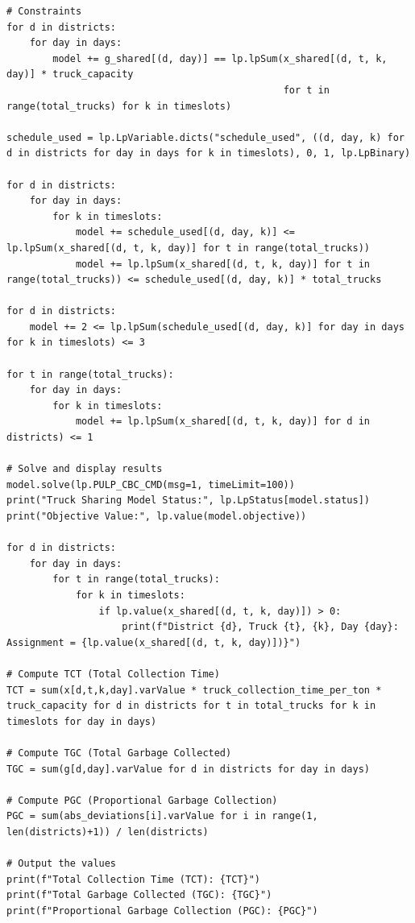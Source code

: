 \documentclass{article}
\begin{document}
\begin{verbatim}
# Constraints
for d in districts:
    for day in days:
        model += g_shared[(d, day)] == lp.lpSum(x_shared[(d, t, k, day)] * truck_capacity
                                                for t in range(total_trucks) for k in timeslots)

schedule_used = lp.LpVariable.dicts("schedule_used", ((d, day, k) for d in districts for day in days for k in timeslots), 0, 1, lp.LpBinary)

for d in districts:
    for day in days:
        for k in timeslots:
            model += schedule_used[(d, day, k)] <= lp.lpSum(x_shared[(d, t, k, day)] for t in range(total_trucks))
            model += lp.lpSum(x_shared[(d, t, k, day)] for t in range(total_trucks)) <= schedule_used[(d, day, k)] * total_trucks

for d in districts:
    model += 2 <= lp.lpSum(schedule_used[(d, day, k)] for day in days for k in timeslots) <= 3

for t in range(total_trucks):
    for day in days:
        for k in timeslots:
            model += lp.lpSum(x_shared[(d, t, k, day)] for d in districts) <= 1

# Solve and display results
model.solve(lp.PULP_CBC_CMD(msg=1, timeLimit=100))
print("Truck Sharing Model Status:", lp.LpStatus[model.status])
print("Objective Value:", lp.value(model.objective))

for d in districts:
    for day in days:
        for t in range(total_trucks):
            for k in timeslots:
                if lp.value(x_shared[(d, t, k, day)]) > 0:
                    print(f"District {d}, Truck {t}, {k}, Day {day}: Assignment = {lp.value(x_shared[(d, t, k, day)])}")

# Compute TCT (Total Collection Time)
TCT = sum(x[d,t,k,day].varValue * truck_collection_time_per_ton * truck_capacity for d in districts for t in total_trucks for k in timeslots for day in days)

# Compute TGC (Total Garbage Collected)
TGC = sum(g[d,day].varValue for d in districts for day in days)

# Compute PGC (Proportional Garbage Collection)
PGC = sum(abs_deviations[i].varValue for i in range(1, len(districts)+1)) / len(districts)

# Output the values
print(f"Total Collection Time (TCT): {TCT}")
print(f"Total Garbage Collected (TGC): {TGC}")
print(f"Proportional Garbage Collection (PGC): {PGC}")

\end{verbatim}
\end{document}

